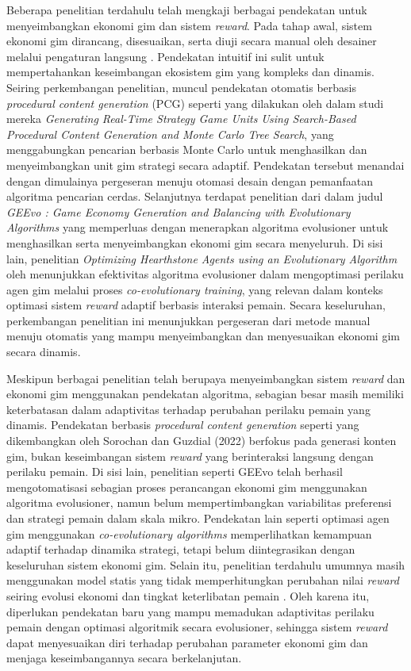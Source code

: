 Beberapa penelitian terdahulu telah mengkaji berbagai pendekatan untuk menyeimbangkan ekonomi gim dan sistem \textit{reward}. Pada tahap awal, sistem ekonomi gim dirancang, disesuaikan, serta diuji secara manual oleh desainer melalui pengaturan langsung \citep{schreiber2021game}. Pendekatan intuitif ini sulit untuk mempertahankan keseimbangan ekosistem gim yang kompleks dan dinamis. Seiring perkembangan penelitian, muncul pendekatan otomatis berbasis \textit{procedural content generation} (PCG) seperti yang dilakukan oleh \citet{sorochan2022generatingrealtimestrategygame} dalam studi mereka \textit{Generating Real-Time Strategy Game Units Using Search-Based Procedural Content Generation and Monte Carlo Tree Search}, yang menggabungkan pencarian berbasis Monte Carlo untuk menghasilkan dan menyeimbangkan unit gim strategi secara adaptif. Pendekatan tersebut menandai dengan dimulainya pergeseran menuju otomasi desain dengan pemanfaatan algoritma pencarian cerdas. Selanjutnya terdapat penelitian dari \citet{Rupp_2024} dalam judul \textit{GEEvo : Game Economy Generation and Balancing with Evolutionary Algorithms} yang memperluas dengan menerapkan algoritma evolusioner untuk menghasilkan serta menyeimbangkan ekonomi gim secara menyeluruh. Di sisi lain, penelitian \textit{Optimizing Hearthstone Agents using an Evolutionary Algorithm} oleh \cite{garcia2020optimizing} menunjukkan efektivitas algoritma evolusioner dalam mengoptimasi perilaku agen gim melalui proses \textit{co-evolutionary training}, yang relevan dalam konteks optimasi sistem \textit{reward} adaptif berbasis interaksi pemain. Secara keseluruhan, perkembangan penelitian ini menunjukkan pergeseran dari metode manual menuju otomatis yang mampu menyeimbangkan dan menyesuaikan ekonomi gim secara dinamis.  

Meskipun berbagai penelitian telah berupaya menyeimbangkan sistem \textit{reward} dan ekonomi gim menggunakan pendekatan algoritma, sebagian besar masih memiliki keterbatasan dalam adaptivitas terhadap perubahan perilaku pemain yang dinamis. Pendekatan berbasis \textit{procedural content generation} seperti yang dikembangkan oleh Sorochan dan Guzdial (2022) berfokus pada generasi konten gim, bukan keseimbangan sistem \textit{reward} yang berinteraksi langsung dengan perilaku pemain. Di sisi lain, penelitian seperti GEEvo \citep{Rupp_2024} telah berhasil mengotomatisasi sebagian proses perancangan ekonomi gim menggunakan algoritma evolusioner, namun belum mempertimbangkan variabilitas preferensi dan strategi pemain dalam skala mikro. Pendekatan lain seperti optimasi agen gim menggunakan \textit{co-evolutionary algorithms} \citep{garcia2020optimizing} memperlihatkan kemampuan adaptif terhadap dinamika strategi, tetapi belum diintegrasikan dengan keseluruhan sistem ekonomi gim. Selain itu, penelitian terdahulu umumnya masih menggunakan model statis yang tidak memperhitungkan perubahan nilai \textit{reward} seiring evolusi ekonomi dan tingkat keterlibatan pemain \citep{Bailey2024}. Oleh karena itu, diperlukan pendekatan baru yang mampu memadukan adaptivitas perilaku pemain dengan optimasi algoritmik secara evolusioner, sehingga sistem \textit{reward} dapat menyesuaikan diri terhadap perubahan parameter ekonomi gim dan menjaga keseimbangannya secara berkelanjutan.

